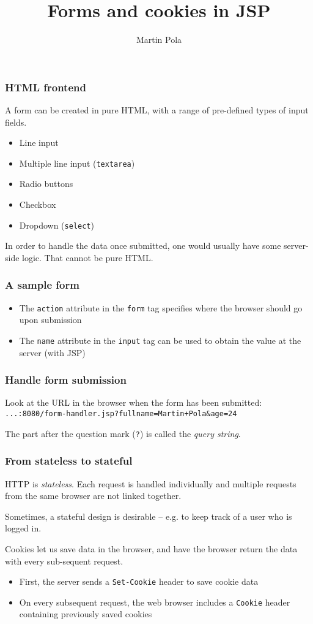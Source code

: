 \documentclass{beamer}
\title{Forms and cookies in JSP}
\author{Martin Pola}
\date{}
\begin{document}
	\maketitle
	
	\frame
	{
		\frametitle{HTML frontend}

		A form can be created in pure HTML, with a range of pre-defined types of input fields.

		\begin{itemize}
			\item Line input
			\item Multiple line input (\texttt{textarea})
			\item Radio buttons
			\item Checkbox
			\item Dropdown (\texttt{select})
		\end{itemize}

		\pause

		In order to handle the data once submitted, one would usually have some server-side logic. That cannot be pure HTML.
	}
	
	\frame
	{
		\frametitle{A sample form}

		

		\pause

		\begin{itemize}
			\item The \texttt{action} attribute in the \texttt{form} tag specifies where the browser should go upon submission
			\item The \texttt{name} attribute in the \texttt{input} tag can be used to obtain the value at the server (with JSP)
		\end{itemize}
	}
	
	\frame
	{
		\frametitle{Handle form submission}

		Look at the URL in the browser when the form has been submitted: \\
		\texttt{...:8080/form-handler.jsp?fullname=Martin+Pola\&age=24}

		The part after the question mark (\texttt{?}) is called the \emph{query string}.

		
	}
	
	\frame
	{
		\frametitle{From stateless to stateful}

		HTTP is \emph{stateless}. Each request is handled individually and multiple requests from the same browser are not linked together.

		Sometimes, a stateful design is desirable -- e.g. to keep track of a user who is logged in.

		Cookies let us save data in the browser, and have the browser return the data with every sub-sequent request.

		\begin{itemize}
			\item First, the server sends a \texttt{Set-Cookie} header to save cookie data
			\item On every subsequent request, the web browser includes a \texttt{Cookie} header containing previously saved cookies
		\end{itemize}
	}
	
\end{document}
